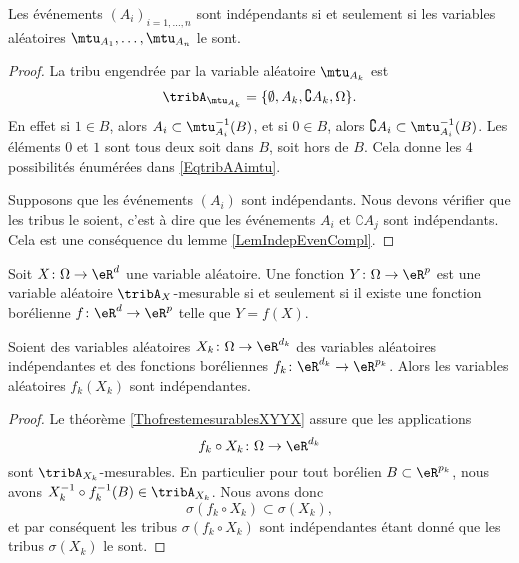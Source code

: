 \begin{proposition}
    Les événements \( (A_i)_{i=1,\ldots,n}\) sont indépendants si et seulement si les variables aléatoires \( \mtu_{A_1},\ldots,\mtu_{A_n}\) le sont.
\end{proposition}

\begin{proof}
    La tribu engendrée par la variable aléatoire \( \mtu_{A_k}\) est
    \begin{equation}    \label{EqtribAAimtu}
        \tribA_{\mtu_{A_k}}=\{ \emptyset,A_k,\complement A_k,\Omega \}.
    \end{equation}
    En effet si \( 1\in B\), alors \( A_i\subset\mtu_{A_i}^{-1}(B)\), et si \( 0\in B\), alors \( \complement A_i\subset\mtu_{A_i}^{-1}(B)\). Les éléments \( 0\) et \( 1\) sont tous deux soit dans \( B\), soit hors de \( B\). Cela donne les \( 4\) possibilités énumérées dans \eqref{EqtribAAimtu}.

    Supposons que les événements \( (A_i)\) sont indépendants. Nous devons vérifier que les tribus le soient, c'est à dire que les événements \( A_i\) et \( \complement A_j\) sont indépendants. Cela est une conséquence du lemme \ref{LemIndepEvenCompl}.
\end{proof}

\begin{theorem}     \label{ThofrestemesurablesXYYX}
    Soit \( X\colon \Omega\to \eR^d\) une variable aléatoire. Une fonction \( Y\colon \Omega\to \eR^{p}\) est une variable aléatoire \( \tribA_X\)-mesurable si et seulement si il existe une fonction borélienne \( f\colon \eR^d\to \eR^{p}\) telle que \( Y=f(X)\).
\end{theorem}

\begin{proposition}
    Soient des variables aléatoires \( X_k\colon \Omega\to \eR^{d_k}\) des variables aléatoires indépendantes et des fonctions boréliennes \( f_k\colon \eR^{d_k}\to \eR^{p_k}\). Alors les variables aléatoires \( f_k(X_k)\) sont indépendantes.
\end{proposition}

\begin{proof}
    Le théorème \ref{ThofrestemesurablesXYYX} assure que les applications
    \begin{equation}
        f_k\circ X_k\colon \Omega\to \eR^{d_k}
    \end{equation}
    sont \( \tribA_{X_k}\)-mesurables. En particulier pour tout borélien \( B\subset\eR^{p_k}\), nous avons \( X^{-1}_k\circ f^{-1}_k(B)\in\tribA_{X_k}\). Nous avons donc
    \begin{equation}
        \sigma(f_k\circ X_k)\subset\sigma(X_k),
    \end{equation}
    et par conséquent les tribus \( \sigma(f_k\circ X_k)\) sont indépendantes étant donné que les tribus \( \sigma(X_k)\) le sont.
\end{proof}

